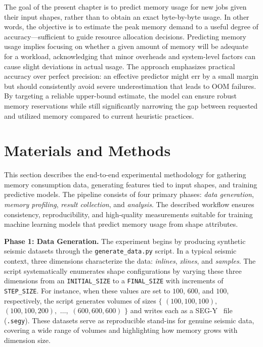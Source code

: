The goal of the present chapter is to predict memory usage for new jobs given their input shapes, rather than to obtain an exact byte-by-byte usage.
In other words, the objective is to estimate the peak memory demand to a useful degree of accuracy—sufficient to guide resource allocation decisions.
Predicting memory usage implies focusing on whether a given amount of memory will be adequate for a workload, acknowledging that minor overheads and system-level factors can cause slight deviations in actual usage.
The approach emphasizes practical accuracy over perfect precision: an effective predictor might err by a small margin but should consistently avoid severe underestimation that leads to \ac{OOM} failures.
By targeting a reliable upper-bound estimate, the model can ensure robust memory reservations while still significantly narrowing the gap between requested and utilized memory compared to current heuristic practices.


\section{Materials and Methods}
\label{sec:pmc-materials-and-methods}

This section describes the end-to-end experimental methodology for gathering memory consumption data, generating features tied to input shapes, and training predictive models.
The pipeline consists of four primary phases:
\emph{data generation}, \emph{memory profiling}, \emph{result collection}, and \emph{analysis}.
The described workflow ensures consistency, reproducibility, and high-quality measurements suitable for training machine learning models that predict memory usage from shape attributes.

\vspace{1em}
\noindent
\textbf{Phase 1: Data Generation.}
The experiment begins by producing synthetic seismic datasets through the \texttt{generate\_data.py} script.
In a typical seismic context, three dimensions characterize the data:
\emph{inlines}, \emph{xlines}, and \emph{samples}.
The script systematically enumerates shape configurations by varying these three dimensions from an \texttt{INITIAL\_SIZE} to a \texttt{FINAL\_SIZE} with increments of \texttt{STEP\_SIZE}.
For instance, when these values are set to $100$, $600$, and $100$, respectively, the script generates volumes of sizes
$\{$ $(100,100,100),$ $(100,100,200),$ $\dots,$ $(600,600,600)$ $\}$
and writes each as a SEG-Y~\cite{barry1975segy} file (\texttt{.segy}).
These datasets serve as reproducible stand-ins for genuine seismic data, covering a wide range of volumes and highlighting how memory grows with dimension size.

